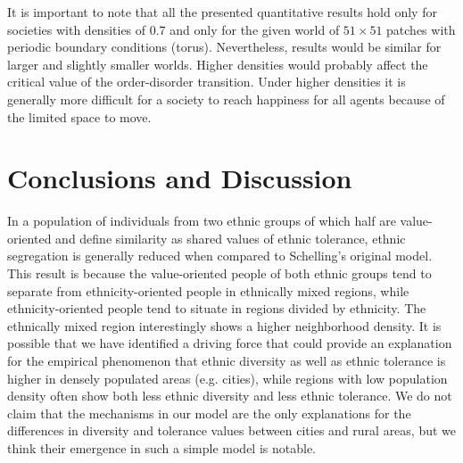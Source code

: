 \documentclass{ws-acs}
\begin{document}
{It is important to note that all the presented quantitative results hold only for societies with densities of 0.7 and only for the given world of $51\times 51$ patches with periodic boundary conditions (torus). Nevertheless, results would be similar for larger and slightly smaller worlds. Higher densities would probably affect the critical value of the order-disorder transition. Under higher densities it is generally more difficult for a society to reach happiness for all agents because of the limited space to move.


\section{Conclusions and Discussion}
In a population of individuals from two ethnic groups of which half are value-oriented and define similarity as shared values of ethnic tolerance, ethnic segregation is generally reduced when compared to Schelling's original model. This result  is because the value-oriented people of both ethnic groups tend to separate from ethnicity-oriented people in ethnically mixed regions, while ethnicity-oriented people tend to situate in regions divided by ethnicity. The ethnically mixed region interestingly shows a higher neighborhood density. It is possible that we have identified a driving force that could provide an explanation for the empirical phenomenon that ethnic diversity as well as ethnic tolerance is higher in densely populated areas (e.g. cities), while regions with low population density often show both less ethnic diversity and less ethnic tolerance. We do not claim that the mechanisms in our model are the only explanations for the differences in diversity and tolerance values between cities and rural areas, but we think their emergence in such a simple model is notable. 

}
\end{document}
